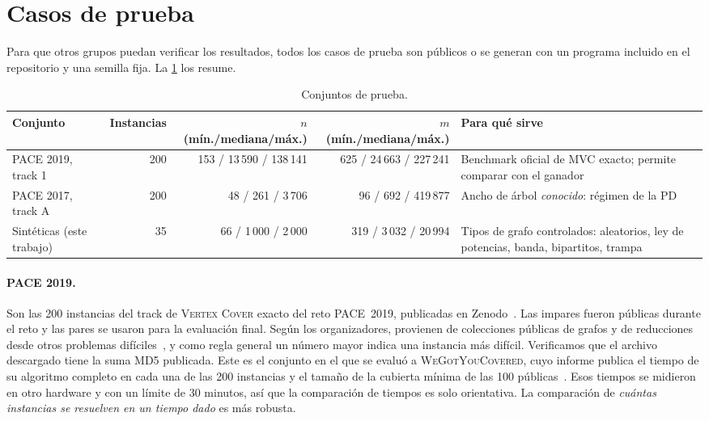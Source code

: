\section{Casos de prueba}\label{sec:casos}

Para que otros grupos puedan verificar los resultados, todos los casos de prueba son públicos o se generan con un programa incluido en el repositorio y una semilla fija. La \cref{tab:datasets} los resume.

\begin{table}[!htbp]
\centering\small
\begin{tabularx}{\textwidth}{@{}>{\raggedright\arraybackslash}p{3.1cm} r r r >{\raggedright\arraybackslash}X@{}}
\toprule
Conjunto & Instancias & $n$ (mín./mediana/máx.) & $m$ (mín./mediana/máx.) & Para qué sirve \\
\midrule
PACE 2019, track 1~\citep{pace2019data} & 200 & 153 / 13\,590 / 138\,141 & 625 / 24\,663 / 227\,241 & Benchmark oficial de MVC exacto; permite comparar con el ganador \\
PACE 2017, track A~\citep{pace2017data} & 200 & 48 / 261 / 3\,706 & 96 / 692 / 419\,877 & Ancho de árbol \emph{conocido}: régimen de la PD \\
Sintéticas (este trabajo) & 35 & 66 / 1\,000 / 2\,000 & 319 / 3\,032 / 20\,994 & Tipos de grafo controlados: aleatorios, ley de potencias, banda, bipartitos, trampa \\
\bottomrule
\end{tabularx}
\caption{Conjuntos de prueba.}
\label{tab:datasets}
\end{table}

\paragraph{PACE 2019.} Son las 200 instancias del track de \textsc{Vertex Cover} exacto del reto PACE~2019, publicadas en Zenodo~\citep{pace2019data}. Las impares fueron públicas durante el reto y las pares se usaron para la evaluación final. Según los organizadores, provienen de colecciones públicas de grafos y de reducciones desde otros problemas difíciles~\citep{pace2019data,dzulfikar2019}, y como regla general un número mayor indica una instancia más difícil. Verificamos que el archivo descargado tiene la suma MD5 publicada. Este es el conjunto en el que se evaluó a \textsc{WeGotYouCovered}, cuyo informe publica el tiempo de su algoritmo completo en cada una de las 200 instancias y el tamaño de la cubierta mínima de las 100 públicas~\citep{hespe2020}. Esos tiempos se midieron en otro hardware y con un límite de 30 minutos, así que la comparación de tiempos es solo orientativa. La comparación de \emph{cuántas instancias se resuelven en un tiempo dado} es más robusta.

